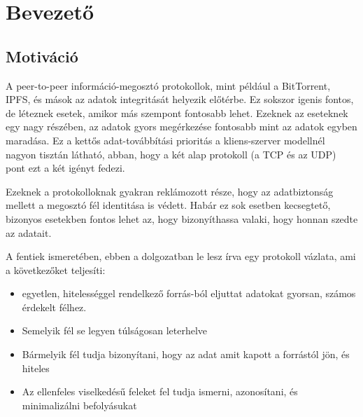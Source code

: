 \chapter{Bevezet\H{o}}\label{ch:BEV}

\section{Motiváció}\label{sec:BEV:mot}

A peer-to-peer információ-megosztó protokollok,
mint például a BitTorrent, IPFS, és mások az
adatok integritását helyezik el\H{o}térbe. Ez
sokszor igenis fontos, de léteznek esetek,
amikor más szempont fontosabb lehet. Ezeknek az
eseteknek egy nagy részében, az adatok gyors
megérkezése fontosabb mint az adatok egyben
maradása. Ez a kett\H{o}s adat-továbbítási
prioritás a kliens-szerver modellnél nagyon
tisztán látható, abban, hogy a két alap
protokoll (a TCP és az UDP) pont ezt a két
igényt fedezi.

Ezeknek a protokolloknak gyakran reklámozott
része, hogy az adatbiztonság mellett a megosztó
fél identitása is védett. Habár ez sok esetben
kecsegtet\H{o}, bizonyos esetekben fontos lehet az,
hogy bizonyíthassa valaki, hogy honnan szedte az
adatait.

A fentiek ismeretében, ebben a dolgozatban le
lesz írva egy protokoll vázlata, ami a
következ\H{o}ket teljesíti:
\begin{itemize}
\item egyetlen, hitelességgel rendelkez\H{o}
forrás-ból eljuttat adatokat gyorsan, számos
érdekelt félhez.
\item Semelyik fél se legyen túlságosan
leterhelve
\item Bármelyik fél tudja bizonyítani, hogy az
adat amit kapott a forrástól jön, és hiteles
\item Az ellenfeles viselkedés\H{u} feleket fel
tudja ismerni, azonosítani, és minimalizálni
befolyásukat
\end{itemize}

